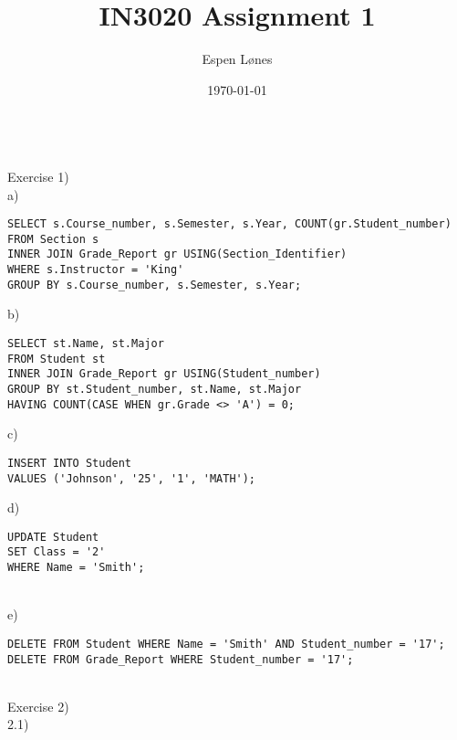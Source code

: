 \documentclass[12pt, letterpaper, twoside]{article}
\begin{document}
\title{IN3020 Assignment 1}
\author{Espen Lønes}
\date{\today}
\maketitle
\ \\
Exercise 1)\\
a)
\begin{verbatim}
SELECT s.Course_number, s.Semester, s.Year, COUNT(gr.Student_number)
FROM Section s
INNER JOIN Grade_Report gr USING(Section_Identifier)
WHERE s.Instructor = 'King'
GROUP BY s.Course_number, s.Semester, s.Year;
\end{verbatim}
b)
\begin{verbatim}
SELECT st.Name, st.Major
FROM Student st
INNER JOIN Grade_Report gr USING(Student_number)
GROUP BY st.Student_number, st.Name, st.Major
HAVING COUNT(CASE WHEN gr.Grade <> 'A') = 0;
\end{verbatim}
c)
\begin{verbatim}
INSERT INTO Student
VALUES ('Johnson', '25', '1', 'MATH');
\end{verbatim}
d)
\begin{verbatim}
UPDATE Student
SET Class = '2'
WHERE Name = 'Smith';
\end{verbatim}
\newpage
\ \\
e)
\begin{verbatim}
DELETE FROM Student WHERE Name = 'Smith' AND Student_number = '17';
DELETE FROM Grade_Report WHERE Student_number = '17';
\end{verbatim}
\ \\
Exercise 2)\\
2.1)\\
\ \\
\end{document}

